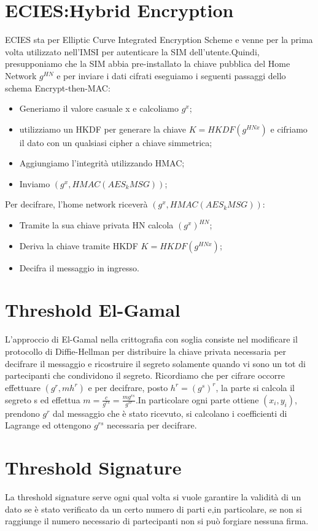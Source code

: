 \documentclass{book}
\begin{document}
\section{ECIES:Hybrid Encryption}
ECIES sta per Elliptic Curve Integrated Encryption Scheme e venne per la prima volta utilizzato nell'IMSI per autenticare la SIM dell'utente.Quindi, presupponiamo che la SIM abbia pre-installato la chiave pubblica del Home Network \(g^{HN}\) e per inviare i dati cifrati eseguiamo i seguenti passaggi dello schema Encrypt-then-MAC:\begin{itemize}
    \item Generiamo il valore casuale x e calcoliamo \(g^{x}\);
    \item utilizziamo un HKDF per generare la chiave \(K=HKDF(g^{HNx})\) e cifriamo il dato con un qualsiasi cipher a chiave simmetrica;
    \item Aggiungiamo l'integrità utilizzando HMAC\@;
    \item Inviamo \({(g^{x},HMAC(AES_{k}{MSG}))}\);
\end{itemize}
Per decifrare, l'home network riceverà \({(g^{x},HMAC(AES_{k}{MSG}))}\):\begin{itemize}
    \item Tramite la sua chiave privata HN calcola \({(g^{x})}^{HN}\);
    \item Deriva la chiave tramite HKDF \(K=HKDF(g^{HNx})\);
    \item Decifra il messaggio in ingresso.
\end{itemize}
\section{Threshold El-Gamal}
L'approccio di El-Gamal nella crittografia con soglia consiste nel modificare il protocollo di Diffie-Hellman per distribuire la chiave privata necessaria per decifrare il messaggio e ricostruire il segreto solamente quando vi sono un tot di partecipanti che condividono il segreto. Ricordiamo che per cifrare occorre effettuare \((g^{r},mh^{r})\) e per decifrare, posto \(h^{r}={(g^{s})}^{r}\), la parte si calcola il segreto s ed effettua \(m=\frac{c}{g^{rs}}=\frac{mg^{rs}}{g^{sr}}\).In particolare ogni parte ottiene \((x_{i},y_{i})\), prendono \(g^{r}\) dal messaggio che è stato ricevuto, si calcolano i coefficienti di Lagrange ed ottengono \(g^{rs}\) necessaria per decifrare.
\section{Threshold Signature}
La threshold signature serve ogni qual volta si vuole garantire la validità di un dato se è stato verificato da un certo numero di parti e,in particolare, se non si raggiunge il numero necessario di partecipanti non si può forgiare nessuna firma.
\end{document}
